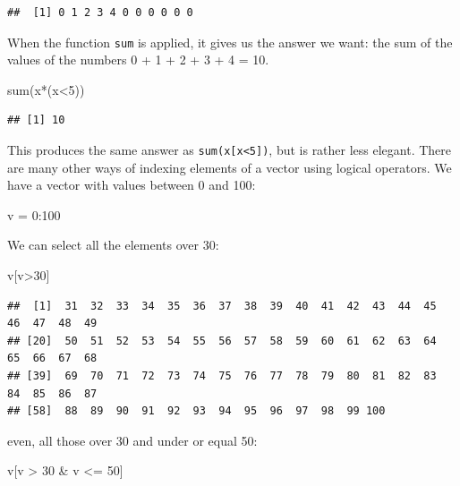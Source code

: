 \documentclass[
]{book}
\newenvironment{Shaded}{\begin{snugshade}}{\end{snugshade}}
\newcommand{\DecValTok}[1]{\textcolor[rgb]{0.00,0.00,0.81}{#1}}
\newcommand{\FunctionTok}[1]{\textcolor[rgb]{0.00,0.00,0.00}{#1}}
\newcommand{\NormalTok}[1]{#1}
\newcommand{\OtherTok}[1]{\textcolor[rgb]{0.56,0.35,0.01}{#1}}
\newcommand{\SpecialCharTok}[1]{\textcolor[rgb]{0.00,0.00,0.00}{#1}}
\begin{document}
\begin{verbatim}
##  [1] 0 1 2 3 4 0 0 0 0 0 0
\end{verbatim}

When the function \texttt{sum} is applied, it gives us the answer we want: the sum of the values of the numbers 0 + 1 + 2 + 3 + 4 = 10.

\begin{Shaded}
\begin{Highlighting}[]
\FunctionTok{sum}\NormalTok{(x}\SpecialCharTok{*}\NormalTok{(x}\SpecialCharTok{\textless{}}\DecValTok{5}\NormalTok{))}
\end{Highlighting}
\end{Shaded}

\begin{verbatim}
## [1] 10
\end{verbatim}

This produces the same answer as \texttt{sum(x{[}x\textless{}5{]})}, but is rather less elegant. There are many other ways of indexing elements of a vector using logical operators. We have a vector with values between 0 and 100:

\begin{Shaded}
\begin{Highlighting}[]
\NormalTok{v }\OtherTok{=} \DecValTok{0}\SpecialCharTok{:}\DecValTok{100}
\end{Highlighting}
\end{Shaded}

We can select all the elements over 30:

\begin{Shaded}
\begin{Highlighting}[]
\NormalTok{v[v}\SpecialCharTok{\textgreater{}}\DecValTok{30}\NormalTok{]}
\end{Highlighting}
\end{Shaded}

\begin{verbatim}
##  [1]  31  32  33  34  35  36  37  38  39  40  41  42  43  44  45  46  47  48  49
## [20]  50  51  52  53  54  55  56  57  58  59  60  61  62  63  64  65  66  67  68
## [39]  69  70  71  72  73  74  75  76  77  78  79  80  81  82  83  84  85  86  87
## [58]  88  89  90  91  92  93  94  95  96  97  98  99 100
\end{verbatim}

even, all those over 30 and under or equal 50:

\begin{Shaded}
\begin{Highlighting}[]
\NormalTok{v[v }\SpecialCharTok{\textgreater{}} \DecValTok{30} \SpecialCharTok{\&}\NormalTok{ v }\SpecialCharTok{\textless{}=} \DecValTok{50}\NormalTok{]}
\end{Highlighting}
\end{Shaded}
\end{document}
